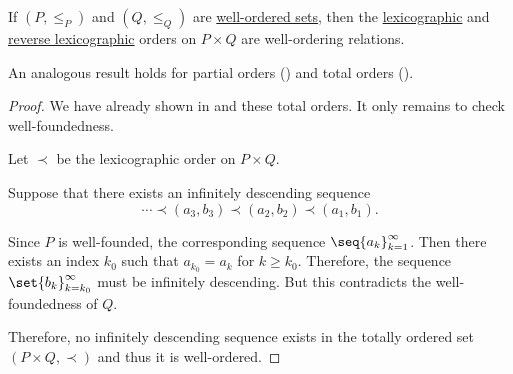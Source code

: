 \begin{proposition}\label{thm:well_ordered_lexicographic_order_is_well_ordered}
  If \( (P, \leq_P) \) and \( (Q, \leq_Q) \) are \hyperref[def:well_ordered_set]{well-ordered sets}, then the \hyperref[eq:def:lexicographic_order]{lexicographic} and \hyperref[eq:def:lexicographic_order/reverse]{reverse lexicographic} orders on \( P \times Q \) are well-ordering relations.
\end{proposition}
\begin{comments}
  \item An analogous result holds for partial orders () and total orders ().
\end{comments}
\begin{proof}
  We have already shown in  and these total orders. It only remains to check well-foundedness.

   Let \( \prec \) be the lexicographic order on \( P \times Q \).

  Suppose that there exists an infinitely descending sequence
  \begin{equation*}
    \cdots \prec (a_3, b_3) \prec (a_2, b_2) \prec (a_1, b_1).
  \end{equation*}

  Since \( P \) is well-founded, the corresponding sequence \( \seq{ a_k }_{k=1}^\infty \). Then there exists an index \( k_0 \) such that \( a_{k_0} = a_k \) for \( k \geq k_0 \). Therefore, the sequence \( \set{ b_k }_{k=k_0}^\infty \) must be infinitely descending. But this contradicts the well-foundedness of \( Q \).

  Therefore, no infinitely descending sequence exists in the totally ordered set \( (P \times Q, \prec) \) and thus it is well-ordered.
\end{proof}
